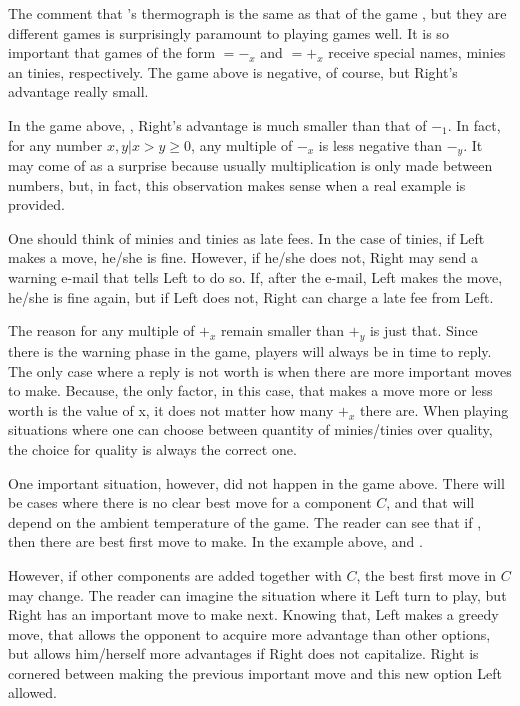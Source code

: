 The comment that \Gm{}'s thermograph is the same as that of the game , but they are different games is surprisingly paramount to playing games well. It is so important that games of the form $=-_x$ and $=+_x$ receive special names, minies an tinies, respectively. The game above is negative, of course, but Right's advantage really small.

In the game above, , Right's advantage is much smaller than that of $-_1$. In fact, for any number $x,y | x > y \ge 0$, any multiple of $-_x$ is less negative than $-_y$. It may come of as a surprise because usually multiplication is only made between numbers, but, in fact, this observation makes sense when a real example is provided.

One should think of minies and tinies as late fees. In the case of tinies, if Left makes a move, he/she is fine. However, if he/she does not, Right may send a warning e-mail that tells Left to do so. If, after the e-mail, Left makes the move, he/she is fine again, but if Left does not, Right can charge a late fee from Left.

The reason for any multiple of $+_x$ remain smaller than $+_y$ is just that. Since there is the warning phase in the game, players will always be in time to reply. The only case where a reply is not worth is when there are more important moves to make. Because, the only factor, in this case, that makes a move more or less worth is the value of x, it does not matter how many $+_x$ there are. When playing situations where one can choose between quantity of minies/tinies over quality, the choice for quality is always the correct one.

One important situation, however, did not happen in the game above. There will be cases where there is no clear best move for a component $C$, and that will depend on the ambient temperature of the game. The reader can see that if , then there are best first move to make. In the example above,  and .

However, if other components are added together with $C$, the best first move in $C$ may change. The reader can imagine the situation where it Left turn to play, but Right has an important move to make next. Knowing that, Left makes a greedy move, that allows the opponent to acquire more advantage than other options, but allows him/herself more advantages if Right does not capitalize. Right is cornered between making the previous important move and this new option Left allowed.

